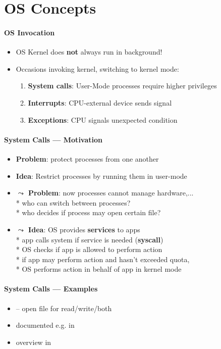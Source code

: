 \section{OS Concepts}

\paragraph{OS Invocation}
\begin{itemize}
	\item OS Kernel does \textbf{not} always run in background!
	\item Occasions invoking kernel, switching to kernel mode:
	\begin{enumerate}
		\item \textbf{System calls}: User-Mode processes require higher privileges
		\item \textbf{Interrupts}: CPU-external device sends signal
		\item \textbf{Exceptions}: CPU signals unexpected condition
	\end{enumerate}
\end{itemize}

\paragraph{System Calls --- Motivation}
\begin{itemize}
	\item \textbf{Problem}: protect processes from one another
	\item \textbf{Idea}: Restrict processes by running them in user-mode
	\item \textbf{\( \leadsto \) Problem}: now processes cannot manage hardware,... \\*
		who can switch between processes? \\*
		who decides if process may open certain file?
	\item \textbf{\( \leadsto \) Idea}: OS provides \textbf{services} to apps \\*
		app calls system if service is needed (\textbf{syscall}) \\*
		OS checks if app is allowed to perform action \\*
		if app may perform action and hasn't exceeded quota, \\* \phantom{x} OS performs action in behalf of app in kernel mode
\end{itemize}

\paragraph{System Calls --- Examples}
\begin{itemize}
	\item {} -- open file for read/write/both
	\item documented e.g. in 
	\item overview in 
\end{itemize}

